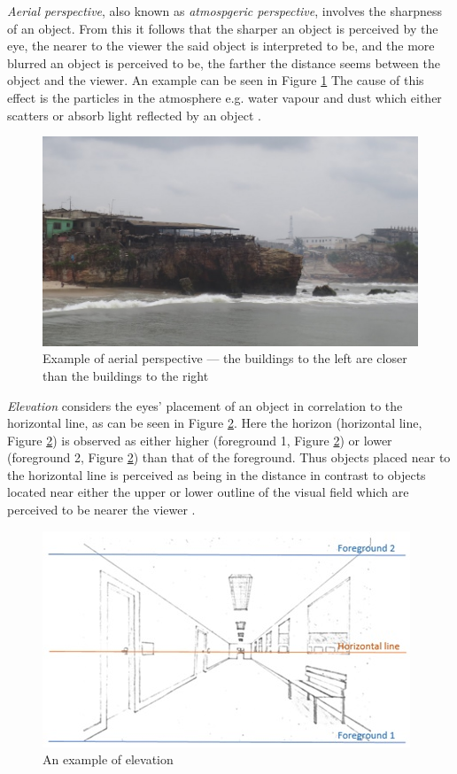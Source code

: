 \textit{Aerial perspective}, also known as \textit{atmospgeric perspective},  involves the sharpness of an object. From this it follows that the sharper an object is perceived by the eye, the nearer to the viewer the said object is interpreted to be, and the more blurred an object is perceived to be, the farther the distance seems between the object and the viewer. An example can be seen in Figure \ref{fig:cue2} The cause of this effect is the particles in the atmosphere e.g. water vapour and dust which either scatters or absorb light reflected by an object \cite{Gale}.  

\begin{figure}[h!]
   \centering
   \includegraphics[width=\textwidth]{figures/cue2.jpg}
   \caption{Example of aerial perspective --- the buildings to the left are closer than the buildings to the right}\label{fig:cue2}
\end{figure}

\pagebreak
\textit{Elevation} considers the eyes’ placement of an object in correlation to the horizontal line, as can be seen in Figure \ref{fig:cue3}. Here the horizon (horizontal line, Figure \ref{fig:cue3}) is observed as either higher (foreground 1, Figure \ref{fig:cue3}) or lower  (foreground 2, Figure \ref{fig:cue3}) than that of the foreground. Thus objects placed near to the horizontal line is perceived as being in the distance in contrast to objects located near either the upper or lower outline of the visual field which are perceived to be nearer the viewer \cite{Gale}.   

\begin{figure}[h!]
   \centering
   \includegraphics[scale=0.8]{figures/cue3.jpg}
   \caption{An example of elevation}\label{fig:cue3}
\end{figure}

